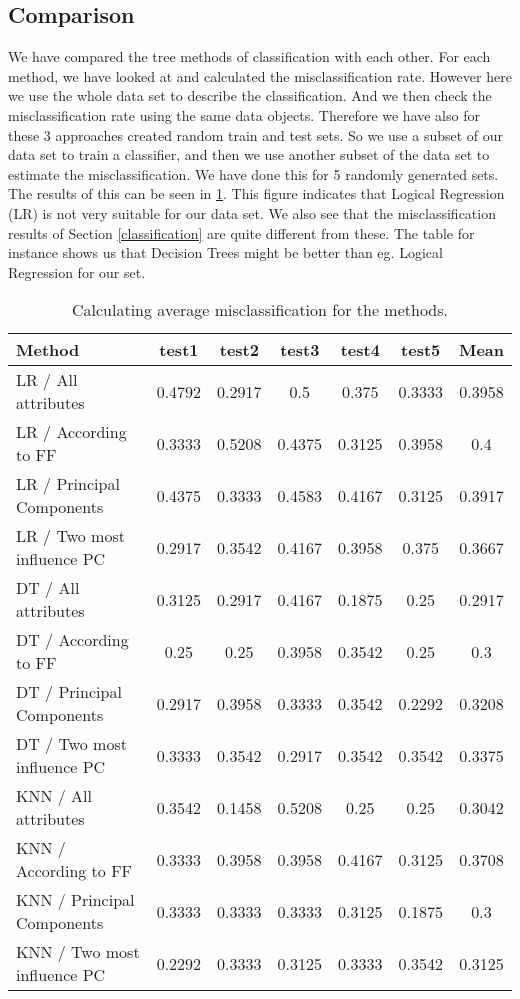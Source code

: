 \subsection{Comparison}
We have compared the tree methods of classification with each other. For each method, we have looked at and calculated the misclassification rate. However here we use the whole data set to describe the classification. And we then check the misclassification rate using the same data objects. Therefore we have also for these 3 approaches created random train and test sets. So we use a subset of our data set to train a classifier, and then we use another subset of the data set to estimate the misclassification. We have done this for 5 randomly generated sets. The results of this can be seen in \ref{misclasRes}. This figure indicates that Logical Regression (LR) is not very suitable for our data set. We also see that the misclassification results of Section \ref{classification} are quite different from these. The table for instance shows us that Decision Trees might be better than eg. Logical Regression for our set.

\begin{table}[H]
\begin{longtable}{lcccccc}
\hline
Method & test1 & test2 & test3 & test4 & test5 & Mean \\ \hline
LR / All attributes & 0.4792 & 0.2917 & 0.5 &   0.375 & 0.3333 & 0.3958\\ 
LR / According to FF & 0.3333 & 0.5208 & 0.4375 & 0.3125  &  0.3958 & 0.4    \\ 
LR / Principal Components & 0.4375  &  0.3333 & 0.4583 & 0.4167 & 0.3125 &     0.3917 \\ 
LR / Two most influence PC & 0.2917 & 0.3542 & 0.4167 & 0.3958 & 0.375    &   0.3667 \\ \hline

DT / All attributes & 0.3125  &    0.2917 & 0.4167 &  0.1875  &    0.25    &    0.2917 \\ 
DT / According to FF & 0.25    &    0.25 &    0.3958 & 0.3542 &  0.25    &    0.3        \\ 
DT / Principal Components & 0.2917 & 0.3958 & 0.3333 &  0.3542 &  0.2292 &  0.3208\\ 
DT / Two most influence PC &  0.3333 & 0.3542 & 0.2917 & 0.3542 &  0.3542 &  0.3375  \\ \hline

KNN / All attributes & 0.3542 &  0.1458 & 0.5208 & 0.25 &    0.25 &       0.3042 \\ 
KNN / According to FF &  0.3333 &  0.3958 &  0.3958 &  0.4167 & 0.3125  &    0.3708 \\ 
KNN / Principal Components & 0.3333 &  0.3333 & 0.3333 &  0.3125   &   0.1875 &     0.3    \\ 
KNN / Two most influence PC & 0.2292 &  0.3333 &  0.3125  &  0.3333 &  0.3542 &  0.3125   \\ \hline

\end{longtable}
\caption{Calculating average misclassification for the methods.}
\label{misclasRes}
\end{table}

